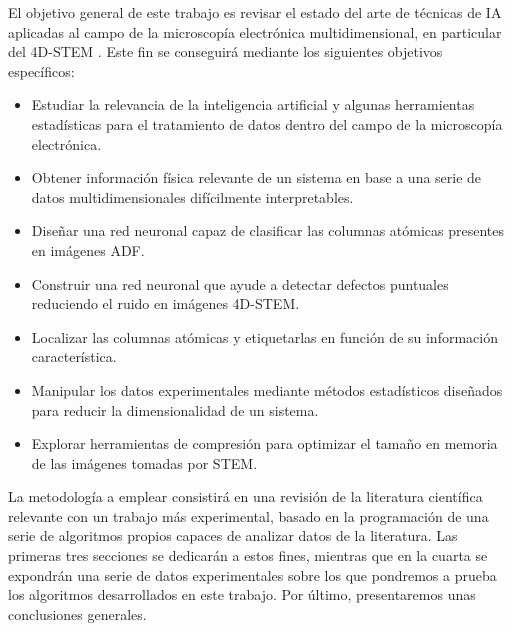 El objetivo general de este trabajo es revisar el estado del arte de técnicas de IA aplicadas al campo de la microscopía electrónica multidimensional, en particular del 4D-STEM \cite{databook}. Este fin se conseguirá mediante los siguientes objetivos específicos:

\begin{itemize}
    \item Estudiar la relevancia de la inteligencia artificial y algunas herramientas estadísticas para el tratamiento de datos dentro del campo de la microscopía electrónica. %
    
    \item Obtener información física relevante de un sistema en base a una serie de datos multidimensionales difícilmente interpretables. %
    
    \item Diseñar una red neuronal capaz de clasificar las columnas atómicas presentes en imágenes ADF. %
    
    \item Construir una red neuronal que ayude a detectar defectos puntuales reduciendo el ruido en imágenes 4D-STEM. %
    
    \item Localizar las columnas atómicas y etiquetarlas en función de su información característica. %
    
    \item Manipular los datos experimentales mediante métodos estadísticos diseñados para reducir la dimensionalidad de un sistema. %
    
    \item Explorar herramientas de compresión para optimizar el tamaño en memoria de las imágenes tomadas por STEM. %
\end{itemize}

La metodología a emplear consistirá en una revisión de la literatura científica relevante con un trabajo más experimental, basado en la programación de una serie de algoritmos propios capaces de analizar datos de la literatura. Las primeras tres secciones se dedicarán a estos fines, mientras que en la cuarta se expondrán una serie de datos experimentales sobre los que pondremos a prueba los algoritmos desarrollados en este trabajo. Por último, presentaremos unas conclusiones generales.